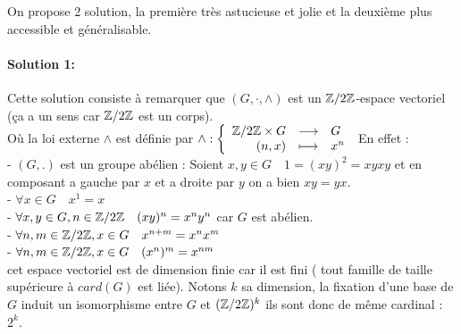 \documentclass[letterpaper,10pt]{article}
\begin{document}
{On propose 2 solution, la première très astucieuse et jolie et la deuxième plus accessible et généralisable.
\paragraph{Solution 1:}
Cette solution consiste à remarquer que $(G,\cdot,\wedge)$ est un $\mathbb{Z}/2\mathbb{Z}$-espace vectoriel (ça a un sens car $\mathbb{Z}/2\mathbb{Z}$ est un corps).\\
Où la loi externe $\wedge$ est définie par 
$ \wedge: \left\{ \begin{array}{rcl} \mathbb{Z}/2\mathbb{Z}\times G& \longrightarrow & G \\
   (n,x) & \longmapsto & x^n \\ \end{array} \right. $
 En effet : \\ - $ (G,.)$ est un groupe abélien : 
Soient $x,y \in G\quad  1 = (xy)^2 = xyxy $ et en composant a gauche par 
$x$ et a droite par $y$ on a bien $xy = yx$.\\
- $\forall x\in G \quad x^1 = x$\\
- $\forall x,y \in G, n\in \mathbb{Z}/2\mathbb{Z} \quad (xy)^n = x^ny^n$ car $G$ est abélien.\\
- $\forall n,m \in \mathbb{Z}/2\mathbb{Z}, x\in G \quad x^{n+m} = x^nx^m$\\
- $\forall n,m \in \mathbb{Z}/2\mathbb{Z}, x\in G \quad (x^n)^m = x^{nm}$\\
cet espace vectoriel est de dimension finie  car il est fini ( tout famille de taille supérieure à $card(G)$ est liée). Notons $k$ sa dimension, la fixation d'une base de $G$ induit un isomorphisme entre $G$ et $(\mathbb{Z}/2\mathbb{Z})^k$ ils sont donc de même cardinal :  $2^k$.
\setlength\parindent{0pt}
}
\end{document}
